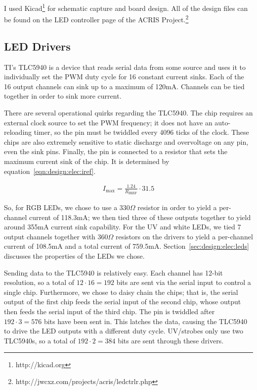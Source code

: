 
I used Kicad\footnote{http://kicad.org} for schematic capture and board design.
All of the design files can be found on the LED controller page of the ACRIS
Project.\footnote{http://jwcxz.com/projects/acris/ledctrlr.php}

\subsection{LED Drivers}
    TI's TLC5940 is a device that reads serial data from some source and
    uses it to individually set the PWM duty cycle for 16 constant current
    sinks.  Each of the 16 output channels can sink up to a maximum of
    120mA.  Channels can be tied together in order to sink more current.

    There are several operational quirks regarding the TLC5940.  The
    chip requires an external clock source to set the PWM frequency; it
    does not have an auto-reloading timer, so the  pin must be
    twiddled every 4096 ticks of the  clock.  These chips are
    also extremely sensitive to static discharge and overvoltage on any
    pin, even the sink pins.  Finally, the  pin is connected to a
    resistor that sets the maximum current sink of the chip.  It is
    determined by equation~\ref{eqn:design:elec:iref}.

    \begin{align}
        \label{eqn:design:elec:iref}
        I_\textrm{max} = \frac{1.24}{R_\textrm{IREF}} \cdot 31.5
    \end{align}

    So, for RGB LEDs, we chose to use a $330\Omega$ resistor in order to
    yield a per-channel current of 118.3mA; we then tied three of these
    outputs together to yield around 355mA current sink capability.  For
    the UV and white LEDs, we tied 7 output channels together with
    $360\Omega$ resistors on the drivers to yield a per-channel current of
    108.5mA and a total current of 759.5mA.
    Section~\ref{sec:design:elec:leds} discusses the properties of the LEDs
    we chose.

    Sending data to the TLC5940 is relatively easy.  Each channel has
    12-bit resolution, so a total of $12\cdot16=192$ bits are sent via the
    serial input to control a single chip.  Furthermore, we chose to daisy
    chain the chips; that is, the serial output of the first chip feeds the
    serial input of the second chip, whose output then feeds the serial
    input of the third chip.  The  pin is twiddled after
    $192\cdot3=576$ bits have been sent in.  This latches the data, causing
    the TLC5940 to drive the LED outputs with a different duty cycle.
    UV/strobes only use two TLC5940s, so a total of $192\cdot2=384$ bits
    are sent through these drivers.

